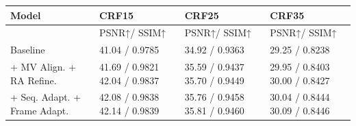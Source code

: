 \begin{tabular}{llll}
\toprule
Model & CRF15 & CRF25 & CRF35 \\
\midrule
 & PSNR↑/ SSIM↑ & PSNR↑/ SSIM↑ & PSNR↑/ SSIM↑ \\
Baseline & 41.04 / 0.9785 & 34.92 / 0.9363 & 29.25 / 0.8238 \\
+ MV Align. + RA Refine. & 41.69 / 0.9821 42.04 / 0.9837 & 35.59 / 0.9437 35.70 / 0.9449 & 29.95 / 0.8403 30.00 / 0.8427 \\
+ Seq. Adapt. + Frame Adapt. & 42.08 / 0.9838 42.14 / 0.9839 & 35.76 / 0.9458 35.81 / 0.9460 & 30.04 / 0.8444 30.09 / 0.8446 \\
\bottomrule
\end{tabular}
